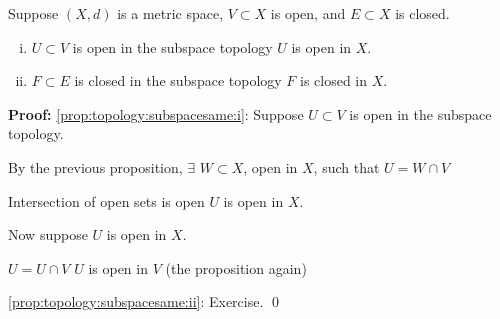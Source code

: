 \documentclass[10pt,aspectratio=169]{beamer}
\begin{document}
\begin{frame}

\begin{proposition}
Suppose $(X,d)$ is a metric space, $V \subset X$ is open,
and $E \subset X$ is closed.
\begin{enumerate}[(i)]
\item
\pause
\label{prop:topology:subspacesame:i}
$U \subset V$ is open in the subspace topology \wiffif $U$ is open
in $X$.
\item
\pause
\label{prop:topology:subspacesame:ii}
$F \subset E$ is closed in the subspace topology \wiffif $F$ is
closed in $X$.
\end{enumerate}
\end{proposition}

\pause

\textbf{Proof:}
\eqref{prop:topology:subspacesame:i}:
Suppose $U \subset V$ is open in the subspace topology.

\pause
\medskip

By the previous proposition, $\exists$ $W \subset X$,
open in $X$, such that $U = W \cap V$

\pause
\medskip

Intersection of open sets is open \wthus $U$ is open in $X$.

\pause
\medskip

Now suppose $U$ is open in $X$.

\pause
\medskip

\thus \quad $U = U \cap V$ \wthus
$U$ is open in $V$ (the proposition again)

\pause
\medskip

\eqref{prop:topology:subspacesame:ii}: Exercise.
\qed

\end{frame}
\end{document}
